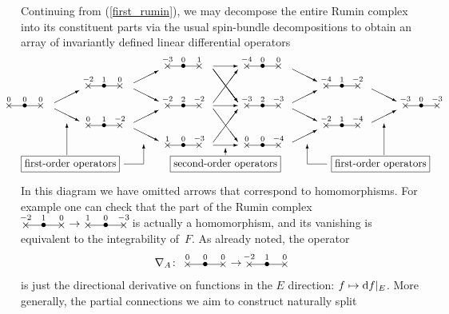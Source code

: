 \documentclass[pdftex]{sigma}%
\numberwithin{equation}{section}
\newcommand{\xox}[3]{\begin{picture}(40,11)
\put(4,1.5){\makebox(0,0){$\times$}}
\put(20,1.5){\makebox(0,0){$\bullet$}}
\put(36,1.5){\makebox(0,0){$\times$}}
\put(4,1.5){\line(1,0){32}}
\put(4,8){\makebox(0,0){$\scriptstyle #1$}}
\put(20,8){\makebox(0,0){$\scriptstyle #2$}}
\put(36,8){\makebox(0,0){$\scriptstyle #3$}}
\end{picture}}
\begin{document}
Continuing from (\ref{first_rumin}), we may decompose the entire Rumin complex
into its constituent parts via the usual spin-bundle decompositions to obtain
an array of invariantly defined linear differential operators
\begin{gather}\label{array_of_operators}
\raisebox{-40pt}{\setlength{\unitlength}{.95pt}
\begin{picture}(410,120)(0,-25)
\put(0,50){\makebox(0,0){\xox{0}{0}{0}}}
\put(80,70){\makebox(0,0){\xox{-2}{1}{0}}}
\put(80,30){\makebox(0,0){\xox{0}{1}{-2}}}
\put(160,90){\makebox(0,0){\xox{-3}{0}{1}}}
\put(160,50){\makebox(0,0){\xox{-2}{2}{-2}}}
\put(160,10){\makebox(0,0){\xox{1}{0}{-3}}}
\put(240,90){\makebox(0,0){\xox{-4}{0}{0}}}
\put(240,50){\makebox(0,0){\xox{-3}{2}{-3}}}
\put(240,10){\makebox(0,0){\xox{0}{0}{-4}}}
\put(320,70){\makebox(0,0){\xox{-4}{1}{-2}}}
\put(320,30){\makebox(0,0){\xox{-2}{1}{-4}}}
\put(400,50){\makebox(0,0){\xox{-3}{0}{-3}}}
\put(30,49){\vector(2,1){25}}
\put(30,43){\vector(2,-1){25}}
\put(110,69){\vector(2,1){25}}
\put(110,63){\vector(2,-1){25}}
\put(110,29){\vector(2,1){25}}
\put(110,23){\vector(2,-1){25}}
\put(190,86){\vector(1,0){25}}
\put(190,46){\vector(1,0){25}}
\put(190,6){\vector(1,0){25}}
\put(190,83){\vector(3,-4){25}}
\put(190,83){\vector(3,-4){25}}
\put(190,49){\vector(3,4){25}}
\put(190,43){\vector(3,-4){25}}
\put(190,9){\vector(3,4){25}}
\put(270,83){\vector(2,-1){25}}
\put(270,49){\vector(2,1){25}}
\put(270,43){\vector(2,-1){25}}
\put(270,9){\vector(2,1){25}}
\put(350,63){\vector(2,-1){25}}
\put(350,29){\vector(2,1){25}}
\put(202.5,-13){\makebox(0,0){\framebox{second-order operators}}}
\put(202.5,-4){\vector(0,1){7}}
\put(46,-13){\makebox(0,0){\framebox{first-order operators}}}
\put(42.5,-4){\vector(0,1){32}}
\put(100,-13){\line(1,0){20}}
\put(120,-13){\vector(0,1){20}}
\put(359,-13){\makebox(0,0){\framebox{first-order operators}}}
\put(362.5,-4){\vector(0,1){32}}
\put(305,-13){\line(-1,0){20}}
\put(285,-13){\vector(0,1){20}}
\end{picture}}\!\!\!\!\!
\end{gather}
In this diagram we have omitted arrows that correspond to homomorphisms. For
example one can check that the part of the Rumin complex
$\xox{-2}{1}{0}\to\xox{1}{0}{-3}$ is actually a homomorphism, and its vanishing
is equivalent to the integrability of~$F$. As already noted, the operator
\[\nabla_A\colon \ \xox{0}{0}{0}\to\xox{-2}{1}{0}\]
is just the directional derivative on functions in the $E$ direction:
$f \mapsto {\rm d}f|_E$.
More generally, the partial connections we aim to construct naturally split
\end{document}
